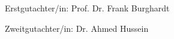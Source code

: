 \begin{titlepage}
\begin{center}
	\begin{Large}
		Erstgutachter/in: Prof. Dr. Frank Burghardt \\
		
	\end{Large}
	
	\begin{Large}
		Zweitgutachter/in: Dr. Ahmed Hussein \\
		
	\end{Large}


\end{center}

\end{titlepage}